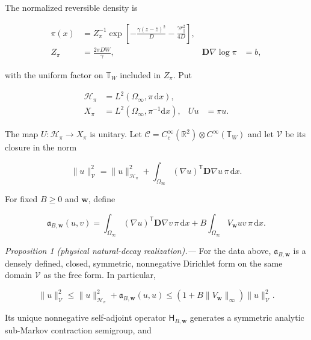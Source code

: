 \documentclass[aps,physrev,reprint,amsmath,amssymb,longbibliography,floatfix]{revtex4-2}
\newcommand{\dd}{\mathrm d}
\begin{document}
The normalized reversible density is

\begin{align}
 \pi(x)&=Z_\pi^{-1}
 \exp\!\left[-\frac{\gamma(z-\bar z)^2}{D}
             -\frac{\gamma r_\parallel^2}{4D}\right],\nonumber\\
 Z_\pi&=\frac{2\pi DW}{\gamma},
 &\bm D\nabla\log\pi&=b,
 \label{eq:d2-reversible-density}
\end{align}

with the uniform factor on $\mathbb T_W$ included in $Z_\pi$.  Put

\begin{align}
 \mathcal H_\pi&=L^2(\Omega_\infty,\pi\,\dd x),\nonumber\\
 X_\pi&=L^2(\Omega_\infty,\pi^{-1}\dd x),
 &Uu&=\pi u .
 \label{eq:d2-weighted-spaces}
\end{align}

The map $U:\mathcal H_\pi\to X_\pi$ is unitary.  Let
$\mathcal C=C_c^\infty(\mathbb R^2)\otimes C^\infty(\mathbb T_W)$ and let
$\mathcal V$ be its closure in the norm

\begin{equation}
 \|u\|_{\mathcal V}^2
 =\|u\|_{\mathcal H_\pi}^2+
  \int_{\Omega_\infty}
  (\nabla u)^{\mathsf T}\bm D\nabla u\,\pi\,\dd x .
 \label{eq:d2-form-domain}
\end{equation}

For fixed $B\ge0$ and $\bm w$, define

\begin{equation}
 \mathfrak a_{B,\bm w}(u,v)
 =\int_{\Omega_\infty}
   (\nabla u)^{\mathsf T}\bm D\nabla v\,\pi\,\dd x
  +B\int_{\Omega_\infty}V_{\bm w}uv\,\pi\,\dd x .
 \label{eq:d2-killed-form}
\end{equation}

\noindent\textit{Proposition 1 (physical natural-decay realization).---}
For the data above, $\mathfrak a_{B,\bm w}$ is a densely defined, closed,
symmetric, nonnegative Dirichlet form on the same domain $\mathcal V$ as the
free form.  In particular,

\begin{equation}
 \|u\|_{\mathcal V}^2
 \le \|u\|_{\mathcal H_\pi}^2+\mathfrak a_{B,\bm w}(u,u)
 \le(1+B\|V_{\bm w}\|_\infty)\|u\|_{\mathcal V}^2 .
 \label{eq:d2-form-equivalence}
\end{equation}

Its unique nonnegative self-adjoint operator $\mathsf H_{B,\bm w}$ generates a
symmetric analytic sub-Markov contraction semigroup, and
\end{document}
